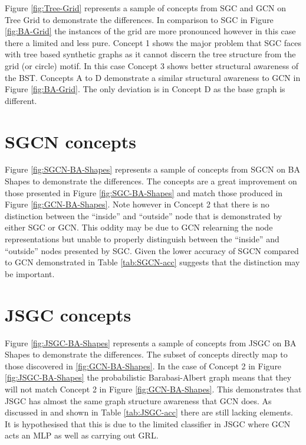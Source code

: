 Figure \ref{fig:Tree-Grid} represents a sample of concepts from SGC and GCN on Tree Grid to demonstrate the differences.
In comparison to SGC in Figure \ref{fig:BA-Grid} the instances of the grid are more pronounced however in this case there a limited and less pure.
Concept 1 shows the major problem that SGC faces with tree based synthetic graphs as it cannot discern the tree structure from the grid (or circle) motif.
In this case Concept 3 shows better structural awareness of the BST.
Concepts A to D demonstrate a similar structural awareness to GCN in Figure \ref{fig:BA-Grid}.
The only deviation is in Concept D as the base graph is different.

\section{SGCN concepts}


Figure \ref{fig:SGCN-BA-Shapes} represents a sample of concepts from SGCN on BA Shapes to demonstrate the differences.
The concepts are a great improvement on those presented in Figure \ref{fig:SGC-BA-Shapes} and match those produced in Figure \ref{fig:GCN-BA-Shapes}.
Note however in Concept 2 that there is no distinction between the ``inside'' and ``outside'' node that is demonstrated by either SGC or GCN.
This oddity may be due to GCN relearning the node representations but unable to properly distinguish between the ``inside'' and ``outside'' nodes presented by SGC.
Given the lower accuracy of SGCN compared to GCN demonstrated in Table \ref{tab:SGCN-acc} suggests that the distinction may be important.

\section{JSGC concepts}


Figure \ref{fig:JSGC-BA-Shapes} represents a sample of concepts from JSGC on BA Shapes to demonstrate the differences.
The subset of concepts directly map to those discovered in \ref{fig:GCN-BA-Shapes}.
In the case of Concept 2 in Figure \ref{fig:JSGC-BA-Shapes} the probabilistic Barabasi-Albert graph means that they will not match Concept 2 in Figure \ref{fig:GCN-BA-Shapes}.
This demonstrates that JSGC has almost the same graph structure awareness that GCN does.
As discussed in  and shown in Table \ref{tab:JSGC-acc} there are still lacking elements.
It is hypothesised that this is due to the limited classifier in JSGC where GCN acts an MLP as well as carrying out GRL.
